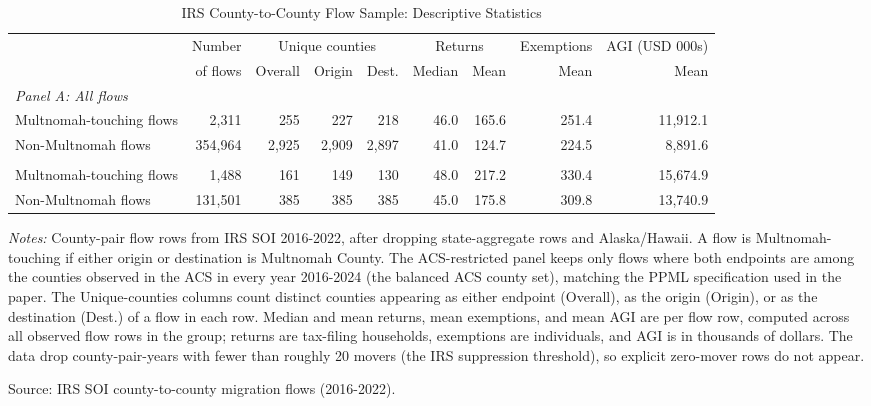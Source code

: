 \begin{table}[htbp]
\centering
\begin{threeparttable}
\footnotesize
\caption{IRS County-to-County Flow Sample: Descriptive Statistics}
\label{tab:tableA2_irs_flow}
\setlength{\tabcolsep}{3pt}
\begin{tabular}{l r r r r r r r r}
\toprule
 & Number & \multicolumn{3}{c}{Unique counties} & \multicolumn{2}{c}{Returns} & Exemptions & AGI (USD 000s) \\
\cmidrule(lr){3-5} \cmidrule(lr){6-7} \cmidrule(lr){8-8} \cmidrule(lr){9-9}
 & of flows & Overall & Origin & Dest. & Median & Mean & Mean & Mean \\
\midrule
\multicolumn{9}{l}{\textit{Panel A: All flows}} \\
\addlinespace
Multnomah-touching flows & 2,311 & 255 & 227 & 218 & 46.0 & 165.6 & 251.4 & 11,912.1 \\
Non-Multnomah flows & 354,964 & 2,925 & 2,909 & 2,897 & 41.0 & 124.7 & 224.5 & 8,891.6 \\
\midrule
\addlinespace[0.4em]
\multicolumn{9}{l}{\textit{Panel B: ACS-restricted (both endpoints in the balanced ACS county set)}} \\
\addlinespace
Multnomah-touching flows & 1,488 & 161 & 149 & 130 & 48.0 & 217.2 & 330.4 & 15,674.9 \\
Non-Multnomah flows & 131,501 & 385 & 385 & 385 & 45.0 & 175.8 & 309.8 & 13,740.9 \\
\bottomrule
\end{tabular}
\begin{tablenotes}[flushleft]
\small
\item \textit{Notes:} County-pair flow rows from IRS SOI 2016-2022, after dropping state-aggregate rows and Alaska/Hawaii. A flow is Multnomah-touching if either origin or destination is Multnomah County. The ACS-restricted panel keeps only flows where both endpoints are among the counties observed in the ACS in every year 2016-2024 (the balanced ACS county set), matching the PPML specification used in the paper. The Unique-counties columns count distinct counties appearing as either endpoint (Overall), as the origin (Origin), or as the destination (Dest.) of a flow in each row. Median and mean returns, mean exemptions, and mean AGI are per flow row, computed across all observed flow rows in the group; returns are tax-filing households, exemptions are individuals, and AGI is in thousands of dollars. The data drop county-pair-years with fewer than roughly 20 movers (the IRS suppression threshold), so explicit zero-mover rows do not appear.
\item Source: IRS SOI county-to-county migration flows (2016-2022).
\end{tablenotes}
\end{threeparttable}
\end{table}
